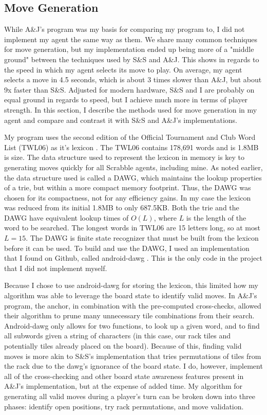\documentclass[letterpaper]{article}
\begin{document}
\subsection{Move Generation}
While A\&J's program was my basis for comparing my program to, I did not implement my agent the same way as them. We share many common techniques for move generation, but my implementation ended up being more of a "middle ground" between the techniques used by S\&S and A\&J. This shows in regards to the speed in which my agent selects its move to play. On average, my agent selects a move in 4.5 seconds, which is about 3 times slower than A\&J, but about 9x faster than S\&S. Adjusted for modern hardware, S\&S and I are probably on equal ground in regards to speed, but I achieve much more in terms of player strength. In this section, I describe the methods used for move generation in my agent and compare and contrast it with S\&S and A\&J's implementations.

My program uses the second edition of the Official Tournament and Club Word List (TWL06) as it's lexicon \cite{naspa}. The TWL06 contains 178,691 words and is 1.8MB is size. The data structure used to represent the lexicon in memory is key to generating moves quickly for all Scrabble agents, including mine. As noted earlier, the data structure used is called a DAWG, which maintains the lookup properties of a trie, but within a more compact memory footprint. Thus, the DAWG was chosen for its compactness, not for any efficiency gains. In my case the lexicon was reduced from its initial 1.8MB to only 687.5KB. Both the trie and the DAWG have equivalent lookup times of $O(L)$, where $L$ is the length of the word to be searched. The longest words in TWL06 are 15 letters long, so at most $L=15$. The DAWG is finite state recognizer that must be built from the lexicon before it can be used. To build and use the DAWG, I used an implementation that I found on Github, called android-dawg \cite{icantrap}. This is the only code in the project that I did not implement myself.

Because I chose to use android-dawg for storing the lexicon, this limited how my algorithm was able to leverage the board state to identify valid moves. In A\&J's program, the anchor, in combination with the pre-computed cross-checks, allowed their algorithm to prune many unnecessary tile combinations from their search. Android-dawg only allows for two functions, to look up a given word, and to find all subwords given a string of characters (in this case, our rack tiles and potentially tiles already placed on the board). Because of this, finding valid moves is more akin to S\&S's implementation that tries permutations of tiles from the rack due to the dawg's ignorance of the board state. I do, however, implement all of the cross-checking and other board state awareness features present in A\&J's implementation, but at the expense of added time. My algorithm for generating all valid moves during a player's turn can be broken down into three phases: identify open positions, try rack permutations, and move validation.
\end{document}
